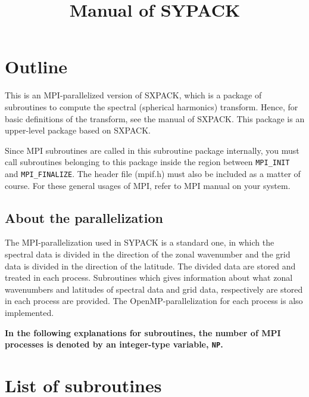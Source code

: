 \documentclass[a4paper]{scrartcl}
\title{Manual of SYPACK}
\author{}
\date{}
\begin{document}
\maketitle

\section{Outline}

This is an MPI-parallelized version of SXPACK, which is 
a package of subroutines to compute the spectral (spherical
harmonics) transform. 
Hence, for basic definitions of the transform, see the
manual of SXPACK. 
This package is an upper-level package based on SXPACK.

Since MPI subroutines are called in this subroutine package
internally, you must call subroutines belonging to this package
inside the region between \texttt{MPI\_INIT} and \texttt{MPI\_FINALIZE}.
The header file (mpif.h) must also be included as a matter of course.
For these general usages of MPI, refer to MPI manual on your system.

\subsection{About the parallelization}

The MPI-parallelization used in SYPACK is a standard one,
in which the spectral data is divided in the direction of 
the zonal wavenumber and the grid data is divided in the
direction of the latitude. The divided data are stored and 
treated in each process.
Subroutines which gives information about what zonal wavenumbers
and latitudes of spectral data and grid data, respectively are stored
in each process are provided. 
The OpenMP-parallelization for each process is also implemented.

\textbf{In the following explanations for subroutines, the number
of MPI processes is denoted by an integer-type variable, 
\texttt{NP}.}


\section{List of subroutines}
\end{document}
